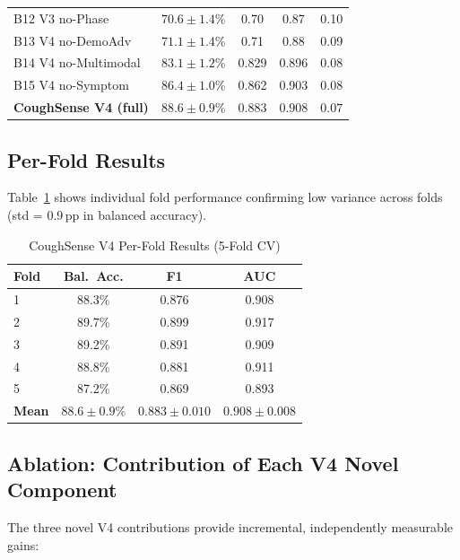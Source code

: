 \documentclass[journal]{IEEEtran}
\begin{document}
\begin{table}[!t]
\begin{tabular}{lcccc}
B12 V3 no-Phase
  & $70.6\pm1.4$\% & 0.70 & 0.87 & 0.10 \\
B13 V4 no-DemoAdv
  & $71.1\pm1.4$\% & 0.71 & 0.88 & 0.09 \\
B14 V4 no-Multimodal
  & $83.1\pm1.2$\% & 0.829 & 0.896 & 0.08 \\
B15 V4 no-Symptom
  & $86.4\pm1.0$\% & 0.862 & 0.903 & 0.08 \\
\midrule
\textbf{CoughSense V4 (full)}
  & $\mathbf{88.6\pm0.9}$\% & $\mathbf{0.883}$ & $\mathbf{0.908}$
  & $\mathbf{0.07}$ \\
\bottomrule
\end{tabular}
\end{table}

\subsection{Per-Fold Results}

Table~\ref{tab:folds} shows individual fold performance confirming
low variance across folds (std = 0.9\,pp in balanced accuracy).

\begin{table}[!t]
\renewcommand{\arraystretch}{1.2}
\caption{CoughSense V4 Per-Fold Results (5-Fold CV)}
\label{tab:folds}
\centering
\begin{tabular}{lccc}
\toprule
\textbf{Fold} & \textbf{Bal.~Acc.} & \textbf{F1} & \textbf{AUC} \\
\midrule
1 & 88.3\% & 0.876 & 0.908 \\
2 & 89.7\% & 0.899 & 0.917 \\
3 & 89.2\% & 0.891 & 0.909 \\
4 & 88.8\% & 0.881 & 0.911 \\
5 & 87.2\% & 0.869 & 0.893 \\
\midrule
\textbf{Mean} & $\mathbf{88.6\pm0.9}$\% & $\mathbf{0.883\pm0.010}$ & $\mathbf{0.908\pm0.008}$ \\
\bottomrule
\end{tabular}
\end{table}

\subsection{Ablation: Contribution of Each V4 Novel Component}

The three novel V4 contributions provide incremental, independently
measurable gains:
\end{document}
